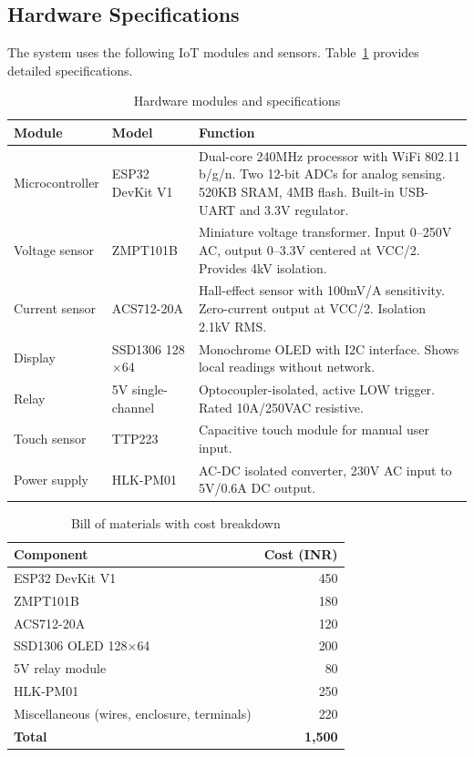 \documentclass[12pt, a4paper]{article}
\numberwithin{figure}{section}
\numberwithin{table}{section}
\begin{document}
	\subsection{Hardware Specifications}
	
	The system uses the following IoT modules and sensors. Table~\ref{tab:hardware} provides detailed specifications.
	
	\begin{table}[H]
		\centering
		\caption{Hardware modules and specifications}
		\label{tab:hardware}
		\vspace{6pt}
		\begin{tabular}{|l|l|p{6.5cm}|}
			\hline
			\textbf{Module} & \textbf{Model} & \textbf{Function} \\
			\hline
			Microcontroller & ESP32 DevKit V1 & Dual-core 240MHz processor with WiFi 802.11 b/g/n. Two 12-bit ADCs for analog sensing. 520KB SRAM, 4MB flash. Built-in USB-UART and 3.3V regulator. \\
			\hline
			Voltage sensor & ZMPT101B & Miniature voltage transformer. Input 0--250V AC, output 0--3.3V centered at VCC/2. Provides 4kV isolation. \\
			\hline
			Current sensor & ACS712-20A & Hall-effect sensor with 100mV/A sensitivity. Zero-current output at VCC/2. Isolation 2.1kV RMS. \\
			\hline
			Display & SSD1306 128$\times$64 & Monochrome OLED with I2C interface. Shows local readings without network. \\
			\hline
			Relay & 5V single-channel & Optocoupler-isolated, active LOW trigger. Rated 10A/250VAC resistive. \\
			\hline
			Touch sensor & TTP223 & Capacitive touch module for manual user input. \\
			\hline
			Power supply & HLK-PM01 & AC-DC isolated converter, 230V AC input to 5V/0.6A DC output. \\
			\hline
		\end{tabular}
	\end{table}
	
	\begin{table}[H]
		\centering
		\caption{Bill of materials with cost breakdown}
		\label{tab:bom}
		\vspace{6pt}
		\begin{tabular}{|l|r|}
			\hline
			\textbf{Component} & \textbf{Cost (INR)} \\
			\hline
			ESP32 DevKit V1 & 450 \\
			ZMPT101B & 180 \\
			ACS712-20A & 120 \\
			SSD1306 OLED 128$\times$64 & 200 \\
			5V relay module & 80 \\
			HLK-PM01 & 250 \\
			Miscellaneous (wires, enclosure, terminals) & 220 \\
			\hline
			\textbf{Total} & \textbf{1,500} \\
			\hline
		\end{tabular}
	\end{table}
	
\end{document}

